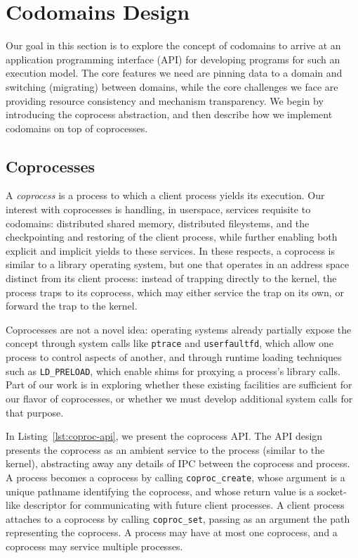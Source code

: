 \section{Codomains Design}
\label{sec:codomains-design}

Our goal in this section is to explore the concept of codomains to arrive at an
application programming interface (API) for developing programs for such an
execution model.
%
The core features we need are pinning data to a domain and switching
(migrating) between domains, while the core challenges we face are providing
resource consistency and mechanism transparency.
%
We begin by introducing the coprocess abstraction, and then describe how we
implement codomains on top of coprocesses.


\subsection{Coprocesses}

A \emph{coprocess} is a process to which a client process yields its
execution.
%
Our interest with coprocesses is handling, in userspace, services requisite to
codomains: distributed shared memory, distributed fileystems, and the
checkpointing and restoring of the client process, while further enabling both
explicit and implicit yields to these services.
%
In these respects, a coprocess is similar to a library operating system, but
one that operates in an address space distinct from its client process: instead of
trapping directly to the kernel, the process traps to its coprocess, which may
either service the trap on its own, or forward the trap to the kernel.


Coprocesses are not a novel idea: operating systems already partially expose the
concept through system calls like \texttt{ptrace} and
\texttt{userfaultfd}, which allow one process to control aspects of another,
and through runtime loading techniques such as \texttt{LD\_PRELOAD}, which
enable shims for proxying a process's library calls.
%
Part of our work is in exploring whether these existing facilities are
sufficient for our flavor of coprocesses, or whether we must develop additional
system calls for that purpose.


%
In Listing~\ref{lst:coproc-api}, we present the coprocess API\@.
%
The API design presents the coprocess as an ambient service to the process
(similar to the kernel), abstracting away any details of IPC between the
coprocess and process.
%
A process becomes a coprocess by calling \texttt{coproc\_create}, whose
argument is a unique pathname identifying the coprocess, and whose return value
is a socket-like descriptor for communicating with future client processes.
%
A client process attaches to a coprocess by calling \texttt{coproc\_set}, passing as an
argument the path representing the coprocess.
%
A process may have at most one coprocess, and a coprocess may service multiple
processes.
%


